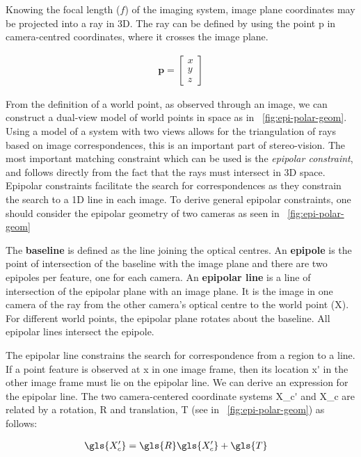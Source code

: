 Knowing the focal length (\(f\)) of the imaging system, image plane coordinates may be projected into a ray in 3D.
The ray can be defined by using the point \gls{p} in camera-centred coordinates, where it crosses the image plane.

\begin{align}
  \mathbf{p} = \begin{bmatrix}
        x\\y\\z
      \end{bmatrix}
\end{align}

From the definition of a world point, as observed through an image, we can construct a dual-view model of world points in space as in \figurename~\ref{fig:epi-polar-geom}.
Using a model of a system with two views allows for the triangulation of rays based on image correspondences, this is an important part of stereo-vision.
The most important matching constraint which can be used is the \emph{epipolar constraint}, and follows directly from the fact that the rays must intersect in 3D space.
Epipolar constraints facilitate the search for correspondences as they constrain the search to a 1D line in each image.
To derive general epipolar constraints, one should consider the epipolar geometry of two cameras as seen in \figurename~\ref{fig:epi-polar-geom}


The \textbf{baseline} is defined as the line joining the optical centres.
An \textbf{epipole} is the point of intersection of the baseline with the image plane and there are two epipoles per feature, one for each camera.
An \textbf{epipolar line} is a line of intersection of the epipolar plane with an image plane.
It is the image in one camera of the ray from the other camera’s optical centre to the world point (\gls{X}).
For different world points, the epipolar plane rotates about the baseline.
All epipolar lines intersect the epipole.

The epipolar line constrains the search for correspondence from a region to a line.
If a point feature is observed at \gls{x} in one image frame, then its location \gls{x'} in the other image frame must lie on the epipolar line.
We can derive an expression for the epipolar line.
The two camera-centered coordinate systems \gls{X_c'} and \gls{X_c} are related by a rotation, \gls{R} and translation, \gls{T} (see in \figurename~\ref{fig:epi-polar-geom}) as follows:

\begin{align}
    \gls{X_c'} &= \gls{R}\gls{X_c'} + \gls{T}
\end{align}

